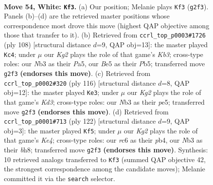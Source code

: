 \documentclass[11pt]{article}
\begin{document}
\clearpage

\begin{figure}[p]\centering
\begin{subfigure}{0.46\textwidth}\centering
\resizebox{\linewidth}{!}{%
\newchessgame
\chessboard[
  setfen={5k2/2P5/2r5/4B3/8/1N6/6K1/8 w - - 21 54},
  showmover=false,
  pgfstyle=straightmove, color=movearrow, markmove={g2-f3}
]}
\caption{}
\end{subfigure}\hfill
\begin{subfigure}{0.46\textwidth}\centering
\resizebox{\linewidth}{!}{%
\newchessgame
\chessboard[
  setfen={1k6/8/8/PP1B4/8/1K6/8/3r4 w - - 1 55},
  showmover=false,
  pgfstyle=straightmove, color=movearrow, markmove={b3-c4}
]}
\caption{}
\end{subfigure}
\\[4pt]
\begin{subfigure}{0.46\textwidth}\centering
\resizebox{\linewidth}{!}{%
\newchessgame
\chessboard[
  setfen={8/1B6/P7/2k1p3/r7/3K4/8/8 w - - 11 59},
  showmover=false,
  pgfstyle=straightmove, color=movearrow, markmove={d3-e3}
]}
\caption{}
\end{subfigure}\hfill
\begin{subfigure}{0.46\textwidth}\centering
\resizebox{\linewidth}{!}{%
\newchessgame
\chessboard[
  setfen={7b/8/7k/8/1p2K3/1P6/8/3B4 w - - 4 62},
  showmover=false,
  pgfstyle=straightmove, color=movearrow, markmove={e4-f5}
]}
\caption{}
\end{subfigure}
\caption{\textbf{Move 54, White: \texttt{Kf3}.} (a) Our position; Melanie plays \texttt{Kf3} (\texttt{g2f3}). Panels (b)--(d) are the retrieved master positions whose correspondence most drove this move (highest QAP objective among those that transfer to it). (b) Retrieved from \texttt{ccrl\_top\_p0003\#1726} (ply 108) [structural distance $d$=9, QAP obj=13]: the master played \texttt{Kc4}; under $\mu$ our \emph{Kg2} plays the role of that game's \emph{Kb3}; cross-type roles: our \emph{N}b3 as their \emph{P}a5, our \emph{B}e5 as their \emph{P}b5; transferred move \texttt{g2f3} \textbf{(endorses this move)}. (c) Retrieved from \texttt{ccrl\_top\_p0002\#320} (ply 116) [structural distance $d$=8, QAP obj=12]: the master played \texttt{Ke3}; under $\mu$ our \emph{Kg2} plays the role of that game's \emph{Kd3}; cross-type roles: our \emph{N}b3 as their \emph{p}e5; transferred move \texttt{g2f3} \textbf{(endorses this move)}. (d) Retrieved from \texttt{ccrl\_top\_p0001\#713} (ply 122) [structural distance $d$=9, QAP obj=3]: the master played \texttt{Kf5}; under $\mu$ our \emph{Kg2} plays the role of that game's \emph{Ke4}; cross-type roles: our \emph{r}c6 as their \emph{p}b4, our \emph{N}b3 as their \emph{b}h8; transferred move \texttt{g2f3} \textbf{(endorses this move)}. Synthesis: 10 retrieved analogs transferred to \texttt{Kf3} (summed QAP objective 42, the strongest correspondence among the candidate moves); Melanie committed it via the \texttt{search} selector.}
\label{fig:thought-m106}
\end{figure}
\end{document}
